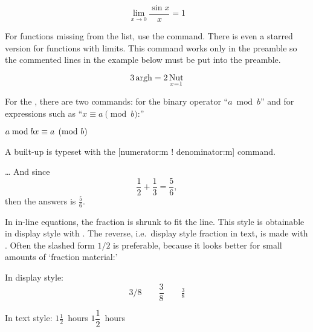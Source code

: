 \begin{example}
\begin{equation*}
  \lim_{x \rightarrow 0}
  \frac{\sin x}{x}=1
\end{equation*}
\end{example}

For functions missing from the list, use the 
command. There is even a starred version for functions with limits.
This command works only in the preamble so the commented lines in the
example below must be put into the preamble.

\begin{example}
\begin{equation*}
  3\operatorname{argh} = 2\operatorname*{Nut}_{x=1}    
\end{equation*}
\end{example}

For the , there are two commands:  for the
binary operator ``$a \bmod b$'' and 
for expressions
such as ``$x\equiv a \pmod{b}$:''
\begin{example}
$a\bmod b \\
 x\equiv a \pmod{b}$
\end{example}

A built-up \emph{} is typeset with the
[numerator:m ! denominator:m]
command.
\begin{example}
\ldots{} And since
\begin{equation*}
  \frac{1}{2} 
  + \frac{1}{3}
  = \frac{5}{6},
\end{equation*}
then the answers is
$\frac{5}{6}$.
\end{example}

In in-line equations, the fraction is shrunk to
fit the line. This style is obtainable in display style with . The
reverse, i.e.\ display style fraction in text, is made with .
Often the slashed form $1/2$ is preferable, because it looks better
for small amounts of `fraction material:'
\begin{example}
In display style:
\begin{equation*}
  3/8 \qquad \frac{3}{8} 
  \qquad \tfrac{3}{8}
\end{equation*}
\end{example}

\begin{example}
In text style:
$1\frac{1}{2}$~hours \qquad
$1\dfrac{1}{2}$~hours
\end{example}
 
